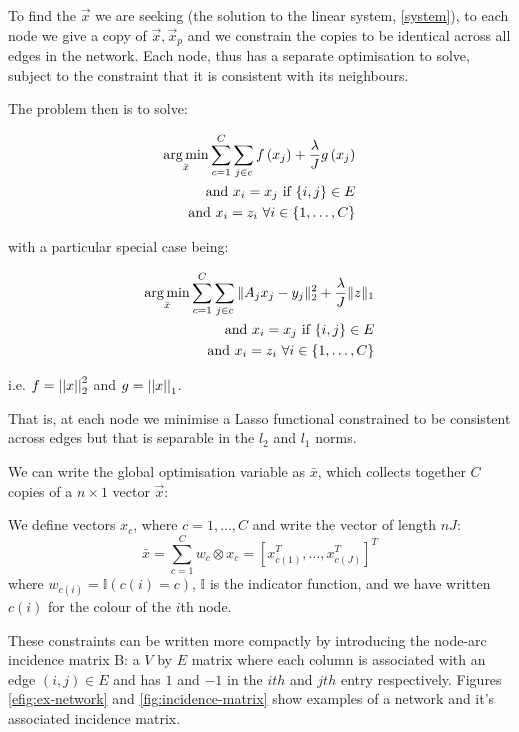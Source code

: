 To find the \(\vec{x}\) we are seeking (the solution to the linear system, \ref{system}), to each node we give a copy of \(\vec{x}, \vec{x}_p\) and we constrain the copies to be identical across all edges in the network. Each node, thus has a separate optimisation to solve, subject to the constraint that it is consistent with its neighbours.

The problem then is to solve:

\begin{align}
\operatorname*{arg\,min}_{\bar{x}} \sum_{c=1}^C \sum_{j \in c} f\left(x_j\right) + \frac{\lambda}{J} g\left(x_j\right) \nonumber \\ 
\text{ and } x_i = x_j \text{ if } \{i,j\} \in E \nonumber \\
\text{ and } x_i = z_i \text{ } \forall i \in \{1, \ldots, C\}
\label{constrainedbp}
\end{align}

with a particular special case being:

\begin{align}
\operatorname*{arg\,min}_{\bar{x}} \sum_{c=1}^C \sum_{j \in c} \|A_jx_j - y_j\|_2^2 + \frac{\lambda}{J}\|z\|_1 \nonumber \\ 
\text{ and } x_i = x_j \text{ if } \{i,j\} \in E \nonumber \\
\text{ and } x_i = z_i \text{ } \forall i \in \{1, \ldots, C\}
\label{constrainedbp}
\end{align}

i.e. \(f = \left|\left|x\right|\right|_2^2\) and \(g = \left|\left|x\right|\right|_1\).

That is, at each node we minimise a Lasso functional constrained to be consistent across edges but that is separable in the \(l_2\) and \(l_1\) norms.

We can write the global optimisation variable as \(\bar{x}\), which collects together \(C\) copies of a \(n\times 1\) vector \(\vec{x}\):

\begin{defn}
We define vectors \(x_c\), where \(c = 1,\ldots , C\) and write the vector of length \(nJ\):
\begin{equation}
\bar{x} = \sum_{c=1}^C w_c \otimes x_c = \left[x_{c(1)}^T, \ldots	, x_{c(J)}^T\right]^T
\label{barxc}
\end{equation}
where \(w_{c(i)} = \mathbb{I}(c(i) = c)\), \(\mathbb{I}\) is the indicator function, and we have written \(c(i)\) for the colour of the \(i\)th node.
\end{defn}

These constraints can be written more compactly by introducing the node-arc incidence matrix B: a \(V\) by \(E\) matrix where each column is associated with an edge \(\left(i,j\right) \in E\) and has \(1\) and \(-1\) in the \(ith\) and \(jth\) entry respectively. Figures \eqref{efig:ex-network} and \eqref{fig:incidence-matrix} show examples of a network and it's associated incidence matrix.

